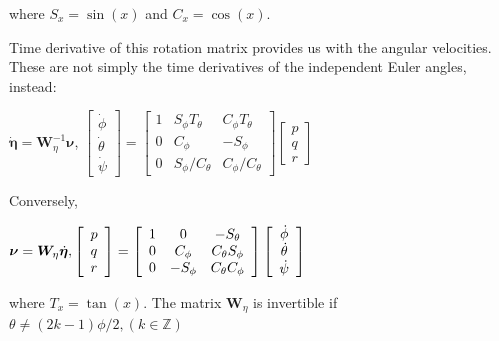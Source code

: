 where $S_{x}=\sin (x)$ and $C_{x}=\cos (x)$.

Time derivative of this rotation matrix provides us with the angular velocities. These are not simply the time derivatives of the independent Euler angles, instead:

$\dot{\boldsymbol{\eta}}=\boldsymbol{W}_{\eta}^{-1} \boldsymbol{\nu}$, \hfill $\left[ \begin{array}{c}{\dot{\phi}} \\ {\dot{\theta}} \\ {\dot{\psi}}\end{array}\right]=\left[ \begin{array}{ccc}{1} & {S_{\phi} T_{\theta}} & {C_{\phi} T_{\theta}} \\ {0} & {C_{\phi}} & {-S_{\phi}} \\ {0} & {S_{\phi} / C_{\theta}} & {C_{\phi} / C_{\theta}}\end{array}\right] \left[ \begin{array}{l}{p} \\ {q} \\ {r}\end{array}\right]$

Conversely,

$\boldsymbol{\nu}=\boldsymbol{W}_{\eta} \dot{\boldsymbol{\eta}}, \hfill \left[ \begin{array}{l}{p} \\ {q} \\ {r}\end{array}\right]=\left[ \begin{array}{ccc}{1} & {0} & {-S_{\theta}} \\ {0} & {C_{\phi}} & {C_{\theta} S_{\phi}} \\ {0} & {-S_{\phi}} & {C_{\theta} C_{\phi}}\end{array}\right] \left[ \begin{array}{c}{\dot{\phi}} \\ {\dot{\theta}} \\ {\dot{\psi}}\end{array}\right]$
  
where $T_{x}=\tan (x)$.
The matrix $\boldsymbol{W}_{\eta}$ is invertible if $\theta \neq(2 k-1) \phi / 2,(k \in \mathbb{Z})$

